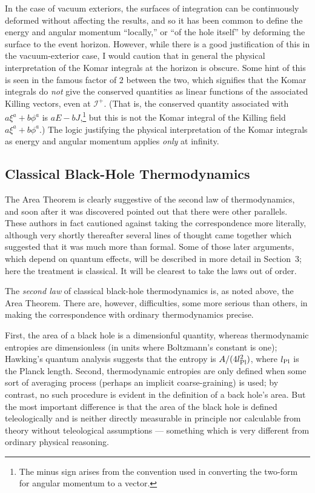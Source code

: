 \documentclass[
%
draft    %
,numberedheadings 
,bibliocites
  ]
  {aipproc}
\newcommand{\scrif}{{{\mathscr I}^{+}}}
\begin{document}
In the case of vacuum exteriors, the surfaces of integration can be continuously deformed without affecting the results, and so it has been common to define the energy and angular momentum ``locally,'' or ``of the hole itself'' by deforming the surface to the event horizon.  However, while there is a good justification of this in the vacuum-exterior case, I would caution 
that in general the physical  interpretation of the Komar integrals at the horizon is obscure.
Some hint of this is seen in the famous factor of $2$ between the two, which signifies that the 
Komar integrals do {\em not} give the
conserved quantities as linear functions of the associated Killing vectors, even at $\scrif$.  
(That is, the conserved quantity associated with $a\xi ^a +b\phi ^a$ is $aE-bJ$,\footnote{The minus sign arises from the convention used in converting the two-form for angular momentum to a vector.} but this is not the Komar integral of the Killing field $a\xi ^a+b\phi ^a$.)  The logic justifying the physical interpretation of the Komar integrals as energy and angular momentum applies {\em only} at infinity.

\subsection{Classical Black-Hole Thermodynamics}

The Area Theorem is clearly suggestive of the second law of thermodynamics, and soon after it was discovered \citet{Bardeen:1973gs} pointed out that there were other parallels.  
These authors in fact cautioned against taking the correspondence more literally, although very shortly thereafter several lines of thought came together which suggested that it was much more than formal.  Some of those later arguments, which depend on quantum effects, will be described in more detail in Section~3; here the treatment is classical.  It will be clearest to take the laws out of order.

The {\em second law} of classical black-hole thermodynamics is, as noted above, the Area Theorem.  There are, however, difficulties, some more serious than others, in making the correspondence with ordinary thermodynamics precise.  

First, the area of a black hole is a dimensionful quantity, whereas thermodynamic entropies are dimensionless (in units where Boltzmann's constant is one); Hawking's quantum analysis suggests that the entropy is $A/(4l_{\rm Pl}^2)$, where $l_{\rm Pl}$ is the Planck length.
Second, thermodynamic entropies are only defined when some sort of averaging process (perhaps an implicit 
coarse-graining) is used; by contrast, no such procedure is evident in the definition of a back hole's area.  
But the most important difference is that the area of the black hole is defined teleologically and is neither directly measurable in principle nor calculable from theory without teleological assumptions --- something which is very different from ordinary physical reasoning.
\end{document}
